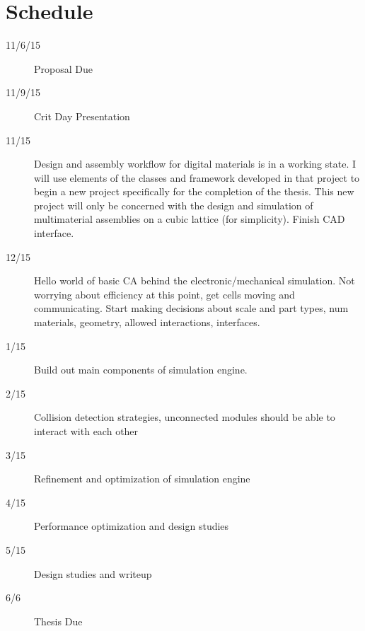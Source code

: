 {\section{Schedule}

\begin{description}
  \item[11/6/15]\tabto{1.5cm}Proposal Due
  \item[11/9/15]\tabto{1.5cm}Crit Day Presentation
  \item[11/15]\tabto{1.5cm}Design and assembly workflow for digital materials is in a working state.  I will use elements of the classes and framework developed in that project to begin a new project specifically for the completion of the thesis.  This new project will only be concerned with the design and simulation of multimaterial assemblies on a cubic lattice (for simplicity).  Finish CAD interface.
  \item[12/15]\tabto{1.5cm}Hello world of basic CA behind the electronic/mechanical simulation.  Not worrying about efficiency at this point, get cells moving and communicating.  Start making decisions about scale and part types, num materials, geometry, allowed interactions, interfaces.
  \item[1/15]\tabto{1.5cm}Build out main components of simulation engine.
  \item[2/15]\tabto{1.5cm}Collision detection strategies, unconnected modules should be able to interact with each other
  \item[3/15]\tabto{1.5cm}Refinement and optimization of simulation engine
  \item[4/15]\tabto{1.5cm}Performance optimization and design studies
  \item[5/15]\tabto{1.5cm}Design studies and writeup
  \item[6/6]\tabto{1.5cm}Thesis Due
\end{description}

}
